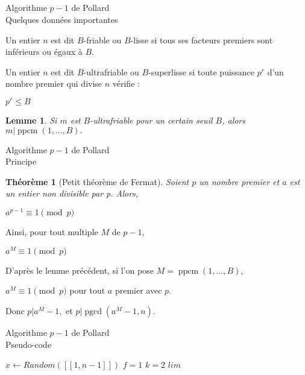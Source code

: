 \documentclass[utf8,10pt,french]{beamer}
\newtheorem{theoreme}{Th{\'e}or{\`e}me}
\newtheorem{lemme}{Lemme}
\DeclareMathOperator{\pgcd}{pgcd}
\DeclareMathOperator{\ppcm}{ppcm}
\begin{document}
\subsection{}
\begin{frame}{Algorithme $p - 1$ de Pollard \\ Quelques données importantes}
\begin{definition}
Un entier $n$ est dit $B$-friable ou $B$-lisse si tous ses facteurs premiers sont inférieurs ou égaux à $B.$
\end{definition} \pause

\begin{definition}
Un entier $n$ est dit $B$-ultrafriable ou $B$-superlisse si toute puissance $p^r$ d’un nombre premier qui divise $n$ vérifie :
\begin{center}
$p^r \leq B$
\end{center}
\end{definition} \pause

\begin{lemme}
Si $m$ est $B$-ultrafriable pour un certain seuil $B$, alors $m | \ppcm(1, ..., B).$
\end{lemme}
\end{frame}

\begin{frame}{Algorithme $p - 1$ de Pollard \\ Principe}
\begin{theoreme}[Petit théorème de Fermat]
Soient $p$ un nombre premier et $a$ est un entier non divisible par p. Alors,
\begin{center}  
$a^{p - 1} \equiv 1 \pmod p$
\end{center}
\end{theoreme} \pause
Ainsi, pour tout multiple $M$ de $p - 1$,
\begin{center}
$a^M \equiv 1 \pmod p$
\end{center} \pause
D'après le lemme précédent, si l'on pose $M = \ppcm(1, ..., B),$
\begin{center}
$a^M \equiv 1 \pmod p$ pour tout $a$ premier avec $p.$
\end{center} \pause
Donc $p | a^M - 1,$ et $p | \pgcd(a^M - 1, n).$
\end{frame}

\begin{frame}{Algorithme $p - 1$ de Pollard \\ Pseudo-code}
\begin{algorithm}[H]
\caption{Factorisation de $n$ par $p-1$ de Pollard}
\BlankLine
$x \gets Random([\![1,n-1]\!])$\;
$f = 1$\;
$k = 2$\;
$lim$\;
\end{algorithm}
\end{frame}
\end{document}
